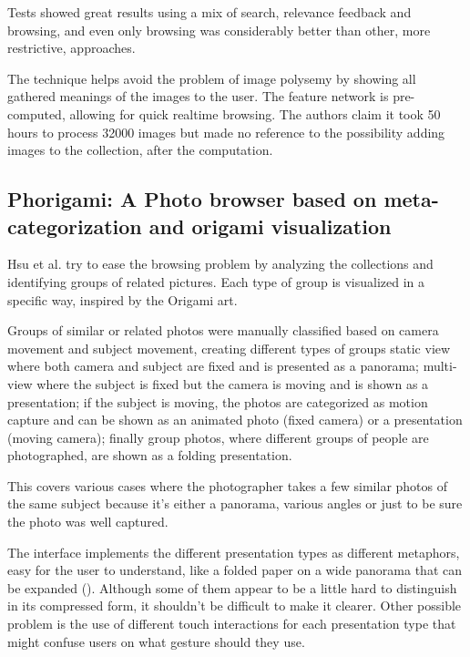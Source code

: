 Tests showed great results using a mix of search, relevance feedback and browsing, and even only browsing was considerably better than other, more restrictive, approaches.

The technique helps avoid the problem of image polysemy by showing all gathered meanings of the images to the user.
The feature network is pre-computed, allowing for quick realtime browsing. The authors claim it took 50 hours to process 32000 images but made no reference to the possibility adding images to the collection, after the computation.


\subsection{Phorigami: A Photo browser based on meta-categorization and origami visualization} %
\label{sub:Hsu}

Hsu et al. \cite{Hsu:2009p2696} try to ease the browsing problem by analyzing the collections and identifying groups of related pictures. Each type of group is visualized in a specific way, inspired by the Origami art.

Groups of similar or related photos were manually classified based on camera movement and subject movement, creating different types of groups static view where both camera and subject are fixed and is presented as a panorama; multi-view where the subject is fixed but the camera is moving and is shown as a presentation; if the subject is moving, the photos are categorized as motion capture and can be shown as an animated photo (fixed camera) or a presentation (moving camera); finally group photos, where different groups of people are photographed, are shown as a folding presentation.

This covers various cases where the photographer takes a few similar photos of the same subject because it's either a panorama, various angles or just to be sure the photo was well captured. 

The interface implements the different presentation types as different metaphors, easy for the user to understand, like a folded paper on a wide panorama that can be expanded (). Although some of them appear to be a little hard to distinguish in its compressed form, it shouldn't be difficult to make it clearer. Other possible problem is the use of different touch interactions for each presentation type that might confuse users on what gesture should they use.

